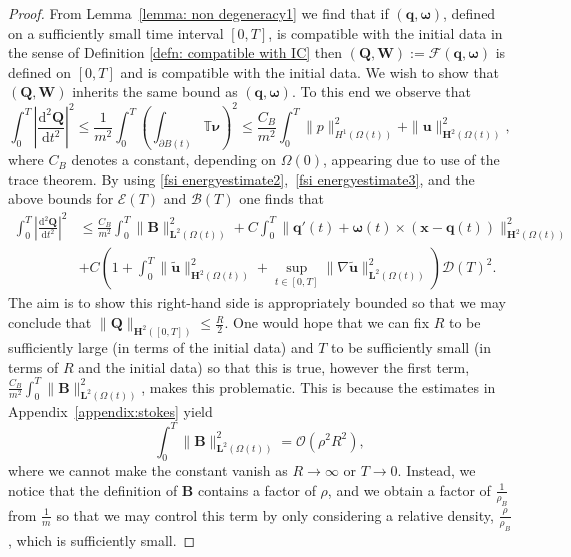\documentclass[a4paper]{amsart}
\numberwithin{equation}{section}
\newcommand{\grad}{\nabla}
\theoremstyle{plain}
\newcommand{\mbf}[1]{\mathbf{#1}}
\newcommand{\mbb}[1]{\mathbb{#1}}
\begin{document}
\begin{proof}
    From Lemma~\ref{lemma: non degeneracy1} we find that if $(\mbf{q},\boldsymbol{\omega})$, defined on a sufficiently small time interval $[0,T]$, is compatible with the initial data in the sense of Definition \ref{defn: compatible with IC} then $(\mbf{Q},\mbf{W}) := \mathscr{F}(\mbf{q},\boldsymbol{\omega})$ is defined on $[0, T]$ and is compatible with the initial data.
    We wish to show that $(\mbf{Q}, \mbf{W})$ inherits the same bound as $(\mbf{q}, \boldsymbol{\omega})$.
    To this end we observe that
    \[ \int_0^{T} \left|\frac{\mathrm{d}^2 \mbf{Q}}{\mathrm{d}t^2}\right|^2 \leq \frac{1}{m^2} \int_0^{T} \left( \int_{\partial B(t)} \mbb{T} \boldsymbol{\nu} \right)^2 \leq  \frac{C_B}{m^2} \int_0^{T} \|p\|_{H^1(\Omega(t))}^2 + \|\mbf{u}\|_{\mbf{H}^2(\Omega(t))}^2, \]
    where $C_B$ denotes a constant, depending on $\Omega(0)$, appearing due to use of the trace theorem.
    By using \eqref{fsi energyestimate2},~\eqref{fsi energyestimate3}, and the above bounds for $\mathcal{E}(T)$ and $\mathcal{B}(T)$ one finds that
    \begin{align*}
        \int_0^{T} \left|\frac{\mathrm{d}^2 \mbf{Q}}{\mathrm{d}t^2}\right|^2 &\leq \frac{C_B}{m^2} \int_{0}^{T} \|\mbf{B}\|_{\mbf{L}^2(\Omega(t))}^2 + C \int_0^{T}\| \mbf{q}'(t) + \boldsymbol{\omega}(t)\times(\mbf{x} - \mbf{q}(t)) \|_{\mbf{H}^{2}(\Omega(t))}^2\\
        &+C\left(1 + \int_0^{T} \|\widetilde{\mbf{u}}\|_{\mbf{H}^2(\Omega(t))}^2 +  \sup_{t \in [0,T]} \|\grad \widetilde{\mbf{u}}\|_{\mbf{L}^2(\Omega(t))}^2\right)\mathcal{D}(T)^2.
    \end{align*}
    The aim is to show this right-hand side is appropriately bounded so that we may conclude that \(\|\mbf{Q}\|_{\mbf{H}^2([0,T])} \leq \frac{R}{2}\).
    One would hope that we can fix $R$ to be sufficiently large (in terms of the initial data) and $T$ to be sufficiently small (in terms of $R$ and the initial data) so that this is true, however the first term, $\frac{C_B}{m^2} \int_{0}^{T} \|\mbf{B}\|_{\mbf{L}^2(\Omega(t))}^2$, makes this problematic.
    This is because the estimates in Appendix~\ref{appendix:stokes} yield
    \[ \int_{0}^{T} \|\mbf{B}\|_{\mbf{L}^2(\Omega(t))}^2  = \mathcal{O}(\rho^2 R^2),\]
    where we cannot make the constant vanish as $R \rightarrow \infty $ or $T \rightarrow 0$.
    Instead, we notice that the definition of $\mbf{B}$ contains a factor of $\rho$, and we obtain a factor of $\frac{1}{\rho_B}$ from $\frac{1}{m}$ so that we may control this term by only considering a relative density, $\frac{\rho}{\rho_B}$, which is sufficiently small.

\end{proof}
\end{document}

